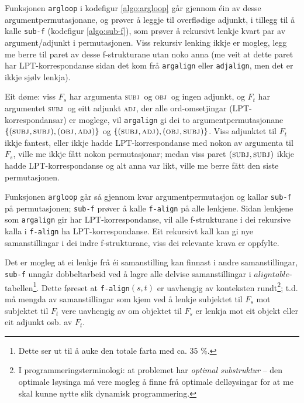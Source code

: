 \documentclass[12pt,a4paper,oneside,draft]{report}
\newcommand{\F}[2]{\textsc{#1}\ensuremath{_{#2}}}
\newcommand{\OBJ}{\F{obj}{}}
\newcommand{\OBJs}{\F{obj~}{}}
\newcommand{\ADJ}{\F{adj}{}}
\newcommand{\SUBJ}{\F{subj}{}}
\newcommand{\SUBJs}{\F{subj~}{}}
\begin{document}
 Funksjonen \texttt{argloop} i kodefigur \ref{algo:argloop} går gjennom éin
 av desse argumentpermutasjonane, og prøver å leggje til overflødige
 adjunkt, i tillegg til å kalle \texttt{sub-f} (kodefigur \ref{algo:sub-f}),
 som prøver å rekursivt lenkje kvart par av argument/adjunkt i
 permutasjonen. Viss rekursiv lenking ikkje er mogleg, legg me berre
 til paret av desse f-strukturane utan noko anna (me veit at dette
 paret har LPT\hyp{}korrespondanse sidan det kom frå \texttt{argalign} eller
 \texttt{adjalign}, men det er ikkje sjølv lenkja).

 Eit døme: viss $F_s$ har argumenta \SUBJs og \OBJs og ingen adjunkt,
 og $F_t$ har argumentet \SUBJs og eitt adjunkt \ADJ, der alle
 ord-omsetjingar (LPT-korrespondansar) er moglege, vil \texttt{argalign} gi
 dei to argumentpermutasjonane $\{(\SUBJ,\SUBJ), (\OBJ,\ADJ)\}$ og
 $\{(\SUBJ,\ADJ), (\OBJ,\SUBJ)\}$. Viss adjunktet til $F_t$ ikkje
 fantest, eller ikkje hadde LPT\hyp{}korrespondanse med nokon av
 argumenta til $F_s$, ville me ikkje fått nokon permutasjonar; medan
 viss paret $(\SUBJ,\SUBJ)$ ikkje hadde LPT\hyp{}korrespondanse og alt
 anna var likt, ville me berre fått den siste permutasjonen.

 Funksjonen \texttt{argloop} går så gjennom kvar argumentpermutasjon og
 kallar \texttt{sub-f} på permutasjonen; \texttt{sub-f} prøver å kalle \texttt{f-align} på
 alle lenkjene. Sidan lenkjene som \texttt{argalign} gir har
 LPT\hyp{}korrespondanse, vil alle f\hyp{}strukturane i dei rekursive kalla i
 \texttt{f-align} ha LPT\hyp{}korrespondanse. Eit rekursivt kall kan gi nye
 samanstillingar i dei indre f\hyp{}strukturane, viss dei relevante krava
 er oppfylte.

 Det er mogleg at ei lenkje frå éi samanstilling kan finnast i andre
 samanstillingar, \texttt{sub-f} unngår dobbeltarbeid ved å lagre alle
 delvise samanstillingar i $aligntable$-tabellen\footnote{Dette ser ut til å auke den totale farta med ca. 35 \%. }. Dette føreset
 at \texttt{f-align}$(s,t)$ er uavhengig av konteksten rundt\footnote{I programmeringsterminologi: at problemet har \emph{optimal         substruktur} -- den optimale løysinga må vere mogleg å finne
        frå optimale delløysingar for at me skal kunne nytte slik
        dynamisk programmering. };
 t.d. må mengda av samanstillingar som kjem ved å lenkje subjektet til
 $F_s$ mot subjektet til $F_t$ vere uavhengig av om objektet til $F_s$
 er lenkja mot eit objekt eller eit adjunkt osb. av $F_t$.
\end{document}
